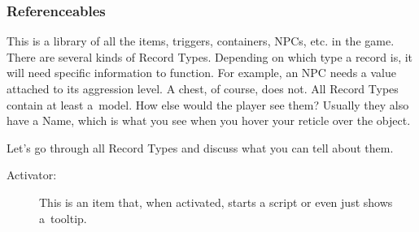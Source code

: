 \subsubsection{Referenceables}
This is a library of all the items, triggers, containers, NPCs, etc. in the game. There are several kinds of Record Types. Depending on which type
a record is, it will need specific information to function. For example, an NPC needs a value attached to its aggression level. A chest, of course,
does not. All Record Types contain at least a~model. How else would the player see them? Usually they also have a Name, which is what you see
when you hover your reticle  over the object.

Let's go through all Record Types and discuss what you can tell \OCS{} about them.

\begin{description}
 \item[Activator:] This is an item that, when activated, starts a script or even just shows a~tooltip.
\end{description}